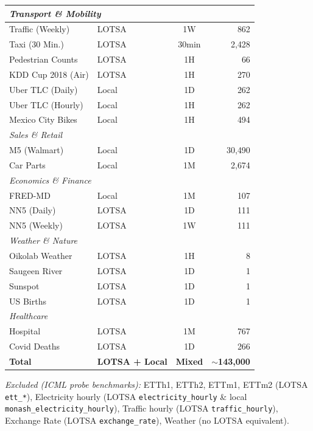 \begin{table}[!ht]
\begin{tabular}{l l c r}
\multicolumn{4}{l}{\textit{Transport \& Mobility}} \\
\midrule
Traffic (Weekly)         & LOTSA & 1W    & 862 \\
Taxi (30 Min.)           & LOTSA & 30min & 2{,}428 \\
Pedestrian Counts        & LOTSA & 1H    & 66 \\
KDD Cup 2018 (Air)       & LOTSA & 1H    & 270 \\
Uber TLC (Daily)         & Local & 1D    & 262 \\
Uber TLC (Hourly)        & Local & 1H    & 262 \\
Mexico City Bikes        & Local & 1H    & 494 \\
\midrule

\multicolumn{4}{l}{\textit{Sales \& Retail}} \\
\midrule
M5 (Walmart)             & Local & 1D    & 30{,}490 \\
Car Parts                & Local & 1M    & 2{,}674 \\
\midrule

\multicolumn{4}{l}{\textit{Economics \& Finance}} \\
\midrule
FRED-MD                  & Local & 1M    & 107 \\
NN5 (Daily)              & LOTSA & 1D    & 111 \\
NN5 (Weekly)             & LOTSA & 1W    & 111 \\
\midrule

\multicolumn{4}{l}{\textit{Weather \& Nature}} \\
\midrule
Oikolab Weather          & LOTSA & 1H    & 8 \\
Saugeen River            & LOTSA & 1D    & 1 \\
Sunspot                  & LOTSA & 1D    & 1 \\
US Births                & LOTSA & 1D    & 1 \\
\midrule

\multicolumn{4}{l}{\textit{Healthcare}} \\
\midrule
Hospital                 & LOTSA & 1M    & 767 \\
Covid Deaths             & LOTSA & 1D    & 266 \\
\midrule

\textbf{Total} & \textbf{LOTSA + Local} & \textbf{Mixed} & \textbf{$\sim$143{,}000} \\
\bottomrule
\end{tabular}

\vspace{2pt}
{\footnotesize
\textit{Excluded (ICML probe benchmarks):}
ETTh1, ETTh2, ETTm1, ETTm2 (LOTSA \texttt{ett\_*}),
Electricity hourly (LOTSA \texttt{electricity\_hourly} \& local \texttt{monash\_electricity\_hourly}),
Traffic hourly (LOTSA \texttt{traffic\_hourly}),
Exchange Rate (LOTSA \texttt{exchange\_rate}),
Weather (no LOTSA equivalent).
}
\end{table}
